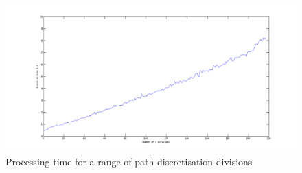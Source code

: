 \begin{figure}[htbp]  
\includegraphics[width=\textwidth]{figures/performance/sDivTime.png}
\caption[Processing time for a range of path discretisation divisions]{Processing time for a range of path discretisation divisions
\label{fig:sDivTime}}
\end{figure} 


